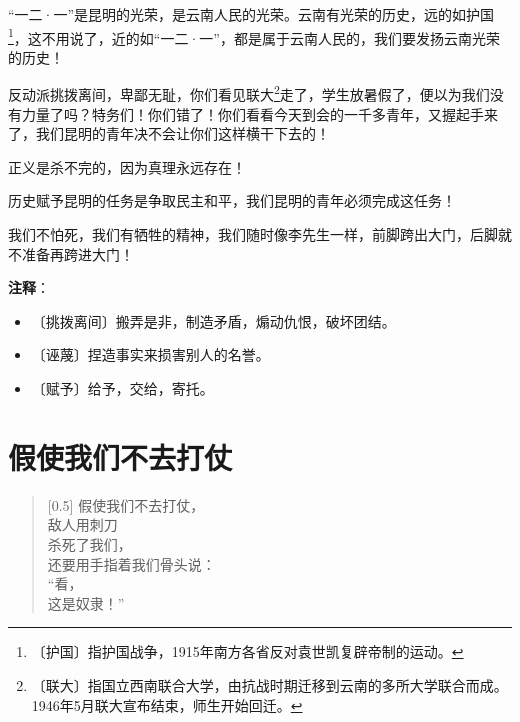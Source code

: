 \documentclass[12pt,UTF-8,openany]{ctexbook}
\begin{document}
\begin{large}
    “一二·一”是昆明的光荣，是云南人民的光荣。云南有光荣的历史，远的如护国\footnote{〔护国〕指护国战争，1915年南方各省反对袁世凯复辟帝制的运动。}，这不用说了，近的如“一二·一”，都是属于云南人民的，我们要发扬云南光荣的历史！
    
    反动派挑拨离间，卑鄙无耻，你们看见联大\footnote{〔联大〕指国立西南联合大学，由抗战时期迁移到云南的多所大学联合而成。1946年5月联大宣布结束，师生开始回迁。}走了，学生放暑假了，便以为我们没有力量了吗？特务们！你们错了！你们看看今天到会的一千多青年，又握起手来了，我们昆明的青年决不会让你们这样横干下去的！
    
    正义是杀不完的，因为真理永远存在！
    
    历史赋予昆明的任务是争取民主和平，我们昆明的青年必须完成这任务！
    
    我们不怕死，我们有牺牲的精神，我们随时像李先生一样，前脚跨出大门，后脚就不准备再跨进大门！
    
\end{large}


\newpage

\textbf{注释}：

\vspace{-1em}

\begin{itemize}
    \setlength\itemsep{-0.2em}
    \item 〔挑拨离间〕搬弄是非，制造矛盾，煽动仇恨，破坏团结。
    \item 〔诬蔑〕捏造事实来损害别人的名誉。
    \item 〔赋予〕给予，交给，寄托。
\end{itemize}

\chapter{假使我们不去打仗}

\begin{large}
    
    \begin{verse}[0.5\linewidth]
        假使我们不去打仗， \\
        敌人用刺刀 \\
        杀死了我们， \\
        还要用手指着我们骨头说： \\
        “看， \\
        这是奴隶！”
    \end{verse}
    
\end{large}
\end{document}
